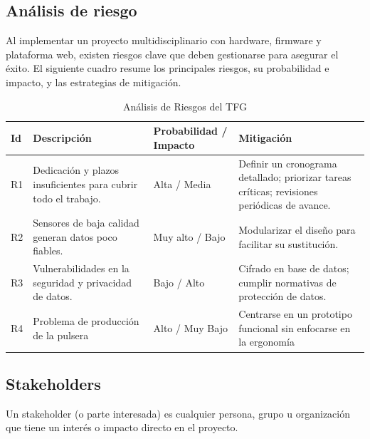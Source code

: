 \documentclass[12pt, a4paper]{article}
\begin{document}
	
		\subsection{Análisis de riesgo}
		Al implementar un proyecto multidisciplinario con hardware, firmware y plataforma web, existen riesgos clave que deben gestionarse para asegurar el éxito. El siguiente cuadro resume los principales riesgos, su probabilidad e impacto, y las estrategias de mitigación.
		
		\begin{table}[ht]
			\centering
			\caption{Análisis de Riesgos del TFG}
			\begin{tabular}{|p{1cm}|p{5cm}|p{3cm}|p{6cm}|}
				\hline
				\textbf{Id} & \textbf{Descripción} & \textbf{Probabilidad / Impacto} & \textbf{Mitigación} \\
				\hline
				R1 & Dedicación y plazos insuficientes para cubrir todo el trabajo. & Alta / Media & Definir un cronograma detallado; priorizar tareas críticas; revisiones periódicas de avance. \\
				\hline
				R2 & Sensores de baja calidad generan datos poco fiables. & Muy alto / Bajo & Modularizar el diseño para facilitar su sustitución. \\
				\hline
				R3 & Vulnerabilidades en la seguridad y privacidad de datos. & Bajo / Alto &  Cifrado en base de datos; cumplir normativas de protección de datos. \\
				\hline
				R4 & Problema de producción de la pulsera & Alto / Muy Bajo & Centrarse en un prototipo funcional sin enfocarse en la ergonomía \\
				\hline
			\end{tabular}
		\end{table}
	
		\subsection{Stakeholders}
		
		Un stakeholder (o parte interesada) es cualquier persona, grupo u organización que tiene un interés o impacto directo en el proyecto.
		
\end{document}
